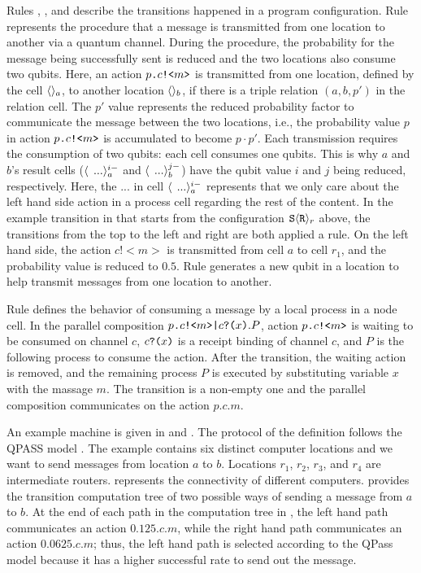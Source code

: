 Rules , , and  describe the transitions happened in a program configuration.
Rule  represents the procedure that a message is transmitted from one location to another via a quantum channel. During the procedure, the probability for the message being successfully sent is reduced and the two locations also consume two qubits.
Here, an action $p\texttt{.}c\texttt{!<}m\texttt{>}$ is transmitted from one location, defined by the cell $\langle  \rangle_{a}$, to another location $\langle  \rangle_{b}$, if there is a triple relation $(a,b,p')$ in the relation cell. 
The $p'$ value represents the reduced probability factor to communicate the message between the two locations, i.e.,
the probability value $p$ in action $p\texttt{.}c\texttt{!<}m\texttt{>}$ is accumulated to become $p\cdot p'$.
Each transmission requires the consumption of two qubits: each cell consumes one qubits.
This is why $a$ and $b$'s result cells ($\langle  \, \;...\rangle^{i-}_{a}$ and $\langle  \, \;...\rangle^{j-}_{b}$) have the qubit value $i$ and $j$ being reduced, respectively.
Here, the $...$ in cell $\langle  \, \;...\rangle^{i-}_{a}$ represents that we only care about the left hand side action in a process cell regarding the rest of the content.
In the example transition in  that starts from the configuration $\texttt{S} \langle \texttt{R} \rangle_{r}$ above,
the transitions from the top to the left and right are both applied a  rule.
On the left hand side, the action $c!<m>$ is transmitted from cell $a$ to cell $r_1$, and the probability value is reduced to $0.5$.
Rule  generates a new qubit in a location to help transmit messages from one location to another.

Rule  defines the behavior of consuming a message by a local process in a node cell.
In the parallel composition $p\texttt{.}c\texttt{!<}m\texttt{>}\texttt{|} c\texttt{?(}x\texttt{)}.P$, action $p\texttt{.}c\texttt{!<}m\texttt{>}$ is waiting to be consumed on channel $c$, 
$c\texttt{?(}x\texttt{)}$ is a receipt binding of channel $c$, and $P$ is the following process to consume the action.
After the transition, the waiting action is removed, and the remaining process $P$ is executed by substituting variable $x$ with the massage $m$. The transition is a non-empty one and the parallel composition communicates on the action $p.c.m$.

An example machine is given in  and .
The protocol of the definition follows the QPASS model \cite{10.1145/3387514.3405853}. 
The example contains six distinct computer locations and we want to send messages from location $a$ to $b$.
Locations $r_1$, $r_2$, $r_3$, and $r_4$ are intermediate routers. 
 represents the connectivity of different computers. 
 provides the transition computation tree of two possible ways of sending a message from $a$ to $b$.
At the end of each path in the computation tree in , the left hand path communicates an action $0.125.c.m$, while the right hand path communicates an action $0.0625.c.m$; thus, the left hand path is selected according to the QPass model because it has a higher successful rate to send out the message.



